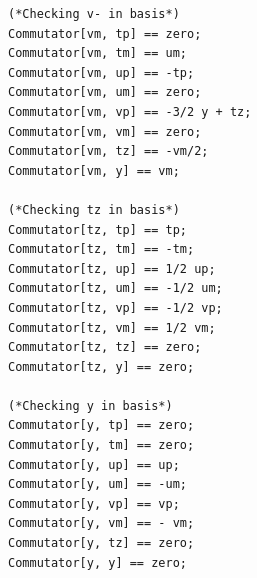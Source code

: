 \documentclass[a4paper,12pt]{article}
\begin{document}
\begin{lstlisting}
(*Checking v- in basis*)
Commutator[vm, tp] == zero;
Commutator[vm, tm] == um;
Commutator[vm, up] == -tp;
Commutator[vm, um] == zero;
Commutator[vm, vp] == -3/2 y + tz;
Commutator[vm, vm] == zero;
Commutator[vm, tz] == -vm/2;
Commutator[vm, y] == vm;

(*Checking tz in basis*)
Commutator[tz, tp] == tp;
Commutator[tz, tm] == -tm;
Commutator[tz, up] == 1/2 up;
Commutator[tz, um] == -1/2 um;
Commutator[tz, vp] == -1/2 vp;
Commutator[tz, vm] == 1/2 vm;
Commutator[tz, tz] == zero;
Commutator[tz, y] == zero;

(*Checking y in basis*)
Commutator[y, tp] == zero;
Commutator[y, tm] == zero;
Commutator[y, up] == up;
Commutator[y, um] == -um;
Commutator[y, vp] == vp;
Commutator[y, vm] == - vm;
Commutator[y, tz] == zero;
Commutator[y, y] == zero;
\end{lstlisting}
\end{document}
